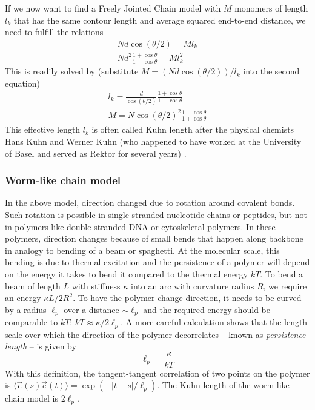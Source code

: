 If we now want to find a Freely Jointed Chain model with $M$ monomers of length $l_k$ that has the same contour length and average squared end-to-end distance, we need to fulfill the relations
\begin{equation}
	\begin{split}
		N d \cos (\theta/2) = M l_k \\
		N d^2  \frac{1+\cos\theta}{1-\cos \theta} = M l_k^2
	\end{split}
\end{equation}
This is readily solved by (substitute $M = (N d \cos(\theta/2))/l_k$ into the second equation)
\begin{equation}
	\begin{split}
		l_k = \frac{d}{\cos(\theta/2)} \frac{1+\cos\theta}{1-\cos \theta} \\
		M = N \cos(\theta/2)^2 \frac{1-\cos \theta}{1+\cos\theta}
	\end{split}
\end{equation}
This effective length $l_k$ is often called Kuhn length after the physical chemists Hans Kuhn and Werner Kuhn (who happened to have worked at the University of Basel and served as Rektor for several years) \citep{kuhn_uber_1934}.


\subsubsection*{Worm-like chain model}
In the above model, direction changed due to rotation around covalent bonds.
Such rotation is possible in single stranded nucleotide chains or peptides, but not in polymers like double stranded DNA or cytoskeletal polymers.
In these polymers, direction changes because of small bends that happen along backbone in analogy to bending of a beam or spaghetti.
At the molecular scale, this bending is due to thermal excitation and the persistence of a polymer will depend on the energy it takes to bend it compared to the thermal energy $kT$.
To bend a beam of length $L$ with stiffness $\kappa$ into an arc with curvature radius $R$, we require an energy $\kappa L/2R^2$.
To have the polymer change direction, it needs to be curved by a radius $\ell_p$ over a distance $\sim \ell_p$ and the required energy should be comparable to $kT$: $kT \approx \kappa /2\ell_p$.
A more careful calculation shows that the length scale over which the direction of the polymer decorrelates -- known as \emph{persistence length} -- is given by
\begin{equation}
	\ell_p  = \frac{\kappa}{kT}
\end{equation}
With this definition, the tangent-tangent correlation of two points on the polymer is $\langle \vec{e}(s)\vec{e}(t)\rangle = \exp(-|t-s|/\ell_p)$.
The Kuhn length of the worm-like chain model is $2\ell_p$.


